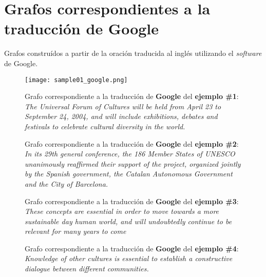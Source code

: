 \documentclass[a4paper,12pt,spanish]{book}
\begin{document}
\section{Grafos correspondientes a la traducción de Google}
\label{appendix-data:grafos-correspondientes-a-la-traduccion-de-google}
Grafos construídos a partir de la oración traducida al inglés utilizando
el \emph{software} de Google.
\begin{figure}[htbp]
\centering
\capstart

\texttt{[image: sample01\_google.png]}
\caption[Grafo correspondiente a la traducción de Google del ejemplo \#1.]{Grafo correspondiente a la traducción de \textbf{Google} del \textbf{ejemplo \#1}:
\emph{The Universal Forum of Cultures will be held from April 23 to September
24, 2004, and will include exhibitions, debates and festivals to celebrate
cultural diversity in the world.}}\label{appendix-data:sample01-google}\end{figure}
\begin{figure}[htbp]
\centering
\capstart

\caption[Grafo correspondiente a la traducción de Google del ejemplo \#2.]{Grafo correspondiente a la traducción de \textbf{Google} del \textbf{ejemplo \#2}:
\emph{In its 29th general conference, the 186 Member States of UNESCO unanimously
reaffirmed their support of the project, organized jointly by the Spanish
government, the Catalan Autonomous Government and the City of Barcelona.}}\label{appendix-data:sample02-google}\end{figure}
\begin{figure}[htbp]
\centering
\capstart

\caption[Grafo correspondiente a la traducción de Google del ejemplo \#3.]{Grafo correspondiente a la traducción de \textbf{Google} del \textbf{ejemplo \#3}:
\emph{These concepts are essential in order to move towards a more sustainable
day human world, and will undoubtedly continue to be relevant for many
years to come}}\label{appendix-data:sample03-google}\end{figure}
\begin{figure}[htbp]
\centering
\capstart

\caption[Grafo correspondiente a la traducción de Google del ejemplo \#4.]{Grafo correspondiente a la traducción de \textbf{Google} del \textbf{ejemplo \#4}:
\emph{Knowledge of other cultures is essential to establish a constructive
dialogue between different communities.}}\label{appendix-data:sample04-google}\end{figure}
\end{document}
